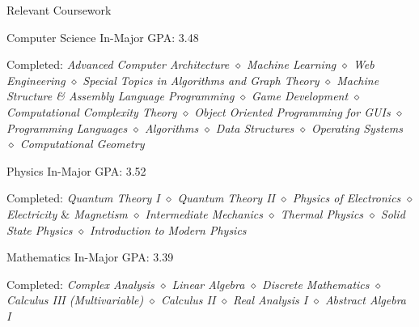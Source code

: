 \documentclass{resume}
\newcommand{\coursep}{\diamond}
\begin{document}
  \begin{rSection}{Relevant Coursework}
    \begin{rSubsection}{Computer Science}
        {In-Major GPA: 3.48}{}{}
        \item Completed: \textit{Advanced Computer Architecture $\coursep$ Machine Learning $\coursep$ Web Engineering $\coursep$ Special Topics in Algorithms and Graph Theory $\coursep$ Machine Structure \& Assembly Language Programming $\coursep$ Game Development $\coursep$ Computational Complexity Theory $\coursep$ Object Oriented Programming for GUIs $\coursep$ Programming Languages $\coursep$ Algorithms $\coursep$ Data Structures $\coursep$ Operating Systems $\coursep$ Computational Geometry}
    \end{rSubsection}
    \begin{rSubsection}{Physics}
        {In-Major GPA: 3.52}{}{}
        \item Completed: \textit{Quantum Theory I $\coursep$ Quantum Theory II $\coursep$ Physics of Electronics $\coursep$ Electricity $\&$ Magnetism $\coursep$ Intermediate Mechanics $\coursep$ Thermal Physics $\coursep$ Solid State Physics $\coursep$ Introduction to Modern Physics}
    \end{rSubsection}
    \begin{rSubsection}{Mathematics}
        {In-Major GPA: 3.39}{}{}
        \item Completed: \textit{Complex Analysis $\coursep$ Linear Algebra $\coursep$ Discrete Mathematics $\coursep$ Calculus III (Multivariable) $\coursep$ Calculus II $\coursep$ Real Analysis I $\coursep$ Abstract Algebra I} 
    \end{rSubsection}
  \end{rSection}
\end{document}
